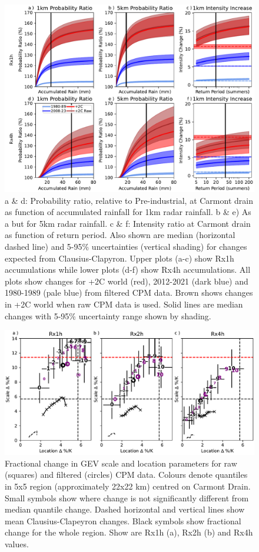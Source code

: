\documentclass[11pt,a4paper]{article}
\begin{document}
\begin{figure}
	\centering
	\includegraphics[width=\linewidth]{intens_prob_ratios}
	\caption{a \& d: Probability ratio, relative to Pre-industrial, at Carmont drain as function of accumulated rainfall for 1km radar rainfall. b \& e) As a but for 5km radar rainfall. c \& f: Intensity ratio at Carmont drain  as function of  return period. Also shown are median (horizontal dashed line) and 5-95\% uncertainties (vertical shading) for changes expected from Clausius-Clapyron. Upper plots (a-c) show Rx1h accumulations while lower plots (d-f) show Rx4h accumulations. All plots show changes for +2C world (red), 2012-2021 (dark blue) and 1980-1989 (pale blue) from filtered CPM data. Brown shows changes in +2C world when raw CPM data is used.   Solid lines are median changes with 5-95\% uncertainty range shown by  shading.}
	\label{fig:int_pr}
\end{figure}

\begin{figure}
	\centering
	\includegraphics[width=\linewidth]{carmont_gev_quant_change}
	\caption{Fractional change in GEV scale  and location parameters for raw (squares) and filtered (circles) CPM data. Colours denote quantiles in 5x5 region (approximately 22x22 km) centred on Carmont Drain. Small symbols show where change is not significantly different from median quantile change. Dashed horizontal and vertical lines show mean Clausius-Clapeyron changes. Black symbols show fractional change for the whole region.  Show are Rx1h (a), Rx2h (b) and Rx4h values.}
	\label{fig:carmont_gev_quant_change}
\end{figure}
\end{document}
